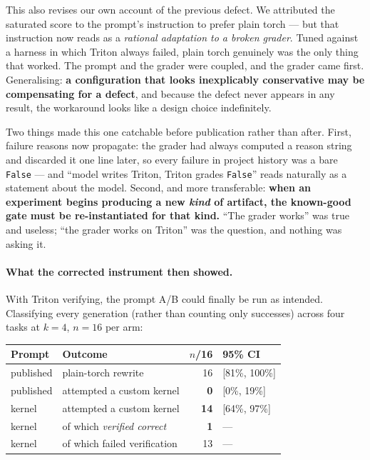 This also revises our own account of the previous defect. We attributed the saturated score to
the prompt's instruction to prefer plain torch --- but that instruction now reads as a
\emph{rational adaptation to a broken grader}. Tuned against a harness in which Triton always
failed, plain torch genuinely was the only thing that worked. The prompt and the grader were
coupled, and the grader came first. Generalising: \textbf{a configuration that looks
inexplicably conservative may be compensating for a defect}, and because the defect never
appears in any result, the workaround looks like a design choice indefinitely.

Two things made this one catchable before publication rather than after. First, failure reasons
now propagate: the grader had always computed a reason string and discarded it one line later,
so every failure in project history was a bare \texttt{False} --- and ``model writes Triton,
Triton grades \texttt{False}'' reads naturally as a statement about the model. Second, and more
transferable: \textbf{when an experiment begins producing a new \emph{kind} of artifact, the
known-good gate must be re-instantiated for that kind.} ``The grader works'' was true and
useless; ``the grader works on Triton'' was the question, and nothing was asking it.

\paragraph{What the corrected instrument then showed.}
With Triton verifying, the prompt A/B could finally be run as intended. Classifying every
generation (rather than counting only successes) across four tasks at $k{=}4$, $n{=}16$ per arm:

\begin{center}\small
\begin{tabular}{@{}llrl@{}}
\toprule
\textbf{Prompt} & \textbf{Outcome} & \textbf{$n$/16} & \textbf{95\% CI} \\
\midrule
published & plain-torch rewrite & 16 & [81\%, 100\%] \\
published & attempted a custom kernel & \textbf{0} & [0\%, 19\%] \\
\midrule
kernel & attempted a custom kernel & \textbf{14} & [64\%, 97\%] \\
kernel & \quad of which \emph{verified correct} & \textbf{1} & --- \\
kernel & \quad of which failed verification & 13 & --- \\
\bottomrule
\end{tabular}
\end{center}

